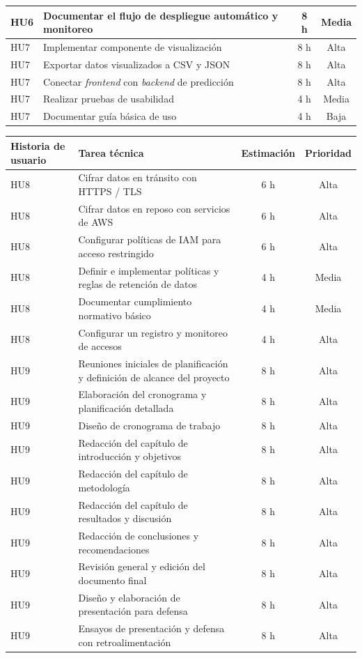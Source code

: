 \documentclass[
11pt, %
]{charter}
\begin{document}
\begin{table}[htpb]
\begin{tabularx}{\linewidth}{@{}|X|X|c|c|@{}}
HU6 & Documentar el flujo de despliegue automático y monitoreo		 					 & 8 h & Media \\ \hline
HU7 & Implementar componente de visualización	 					 & 8 h & Alta \\ \hline
HU7 & Exportar datos visualizados a CSV y JSON	 					 & 8 h & Alta \\ \hline
HU7 & Conectar \textit{frontend} con \textit{backend} de predicción	 					 & 8 h & Alta \\ \hline
HU7 & Realizar pruebas de usabilidad 	 					 & 4 h & Media \\ \hline
HU7 & Documentar guía básica de uso 	 					 & 4 h & Baja \\ \hline
\end{tabularx}
\end{table}
\begin{table}[htpb]
\centering
\begin{tabularx}{\linewidth}{@{}|X|X|c|c|@{}}
\hline
\rowcolor[HTML]{C0C0C0}
Historia de usuario & Tarea técnica & Estimación & Prioridad \\ \hline
HU8 & Cifrar datos en tránsito con HTTPS / TLS	 					 & 6 h & Alta \\ \hline
HU8 & Cifrar datos en reposo con servicios de AWS 	 					 & 6 h & Alta \\ \hline
HU8 & Configurar políticas de IAM para acceso restringido 	 					 & 6 h & Alta \\ \hline
HU8 & Definir e implementar políticas y reglas de retención de datos  & 4 h & Media \\ \hline
HU8 & Documentar cumplimiento normativo básico  & 4 h & Media \\ \hline
HU8 & Configurar un registro y monitoreo de accesos  	 					 & 4 h & Alta \\ \hline
HU9 & Reuniones iniciales de planificación y definición de alcance del proyecto  	 					 & 8 h & Alta \\ \hline
HU9 & Elaboración del cronograma y planificación detallada	  	 					 & 8 h & Alta \\ \hline
HU9 & Diseño de cronograma de trabajo  	 					 & 8 h & Alta \\ \hline
HU9 & Redacción del capítulo de introducción y objetivos	  	 					 & 8 h & Alta \\ \hline
HU9 & Redacción del capítulo de metodología	  	 					 & 8 h & Alta \\ \hline
HU9 & Redacción del capítulo de resultados y discusión	  	 					 & 8 h & Alta \\ \hline
HU9 & Redacción de conclusiones y recomendaciones	  	 					 & 8 h & Alta \\ \hline
HU9 & Revisión general y edición del documento final		  	 					 & 8 h & Alta \\ \hline
HU9 & Diseño y elaboración de presentación para defensa		  	 					 & 8 h & Alta \\ \hline
HU9 & Ensayos de presentación y defensa con retroalimentación		  	 					 & 8 h & Alta \\ \hline
\end{tabularx}
\end{table}
\end{document}
